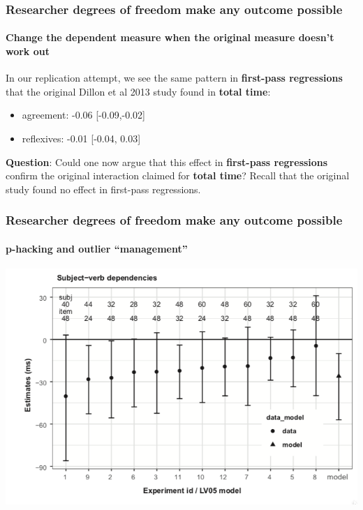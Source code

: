 \documentclass{beamer}
\begin{document}
\begin{frame}[fragile]\frametitle{Researcher degrees of freedom make any outcome possible}
\framesubtitle{Change the dependent measure when the original measure doesn't work out}

In our replication attempt, 
we see the same pattern in \textbf{first-pass regressions} that the original Dillon et al 2013 study found in \textbf{total time}:

\begin{itemize}
\item
agreement: -0.06 [-0.09,-0.02] 
\item 
reflexives: -0.01 [-0.04, 0.03] 
\end{itemize}

\textbf{Question}: Could one now argue that this effect in \textbf{first-pass regressions} confirm the original interaction claimed for \textbf{total time}? Recall that the original study found no effect in first-pass regressions.

\end{frame}

\begin{frame}
\frametitle{Researcher degrees of freedom make any outcome possible}
\framesubtitle{p-hacking and outlier ``management''} 

\begin{center}
\includegraphics[scale=0.35]{subjverbdeps.png}
\end{center}

\end{frame}
\end{document}
